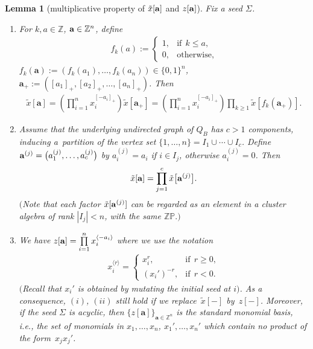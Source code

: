 \documentclass[pdftex]{sigma}
\numberwithin{equation}{section}
\newtheorem{Lemma}[Theorem]{Lemma}
\begin{document}
\begin{Lemma}[multiplicative property of $\tilde{x}{[{\bf a}]}$ and $z{[{\bf a}]}$]\label{multiplicative} Fix a seed $\Sigma$.
\begin{enumerate}\itemsep=0pt
\item[$(i)$] For $k,a\in\mathbb{Z}$, ${\bf a}\in\mathbb{Z}^n$, define
\begin{gather*}
f_k(a)
:=\begin{cases}
1,&\textrm{if} \ \ k\le a,\\
0, &\textrm{otherwise},
\end{cases}
\end{gather*}
$f_k(\mathbf{a}):=(f_k(a_1),\dots,f_k(a_n))\in\{0,1\}^n$,
$\mathbf{a}_+:=([a_1]_+, [a_2]_+,\dots, [a_n]_+)$.
Then
\begin{gather*}
\tilde{x}[\mathbf{a}]
=\left(\prod_{i=1}^n  x_i^{[-a_i]_+}\right)\tilde{x}[\mathbf{a}_+]
=\left(\prod_{i=1}^n  x_i^{[-a_i]_+}\right)\prod_{k\ge1}
\tilde{x}[f_k(\mathbf{a}_+)].
\end{gather*}

\item[$(ii)$] Assume that the underlying undirected graph of $Q_B$ has $c>1$ components, inducing a~partition of the vertex set $\{1,\dots,n\}=I_1\cup\cdots\cup I_c$. Define
${\bf a}^{(j)}=\big(a^{(j)}_1,\dots,a^{(j)}_c\big)$ by $a^{(j)}_i=a_i$ if $i\in I_j$, otherwise $a^{(j)}_i=0$. Then
\begin{gather*}
\tilde{x}[{\bf a}]=\prod_{j=1}^c\tilde{x}\big[{\bf a}^{(j)}\big].
\end{gather*}
$($Note that each factor $\tilde{x}[{\bf a}^{(j)}]$ can be regarded as an element in a cluster algebra of rank $|I_j|<n$, with the same $\mathbb{ZP}.)$

\item[$(iii)$]
We have $z[{\bf a}]=\prod\limits_{i=1}^nx_i^{\langle-a_i\rangle}$ where we use the notation
\begin{gather*}
x_i^{\langle r\rangle}=\begin{cases}
x_i^r,  &\textrm{if} \ \ r\ge 0,\\
(x_i')^{-r}, &\textrm{if} \ \ r< 0.
\end{cases}
\end{gather*}
$($Recall that $x_i'$ is obtained by mutating the initial seed at $i)$.
As a consequence, $(i)$, $(ii)$ still hold if we replace~$\tilde{x}[-]$ by~$z[-]$. Moreover,
if the seed $\Sigma$ is acyclic, then $\{z[\mathbf{a}]\}_{\mathbf{a}\in\mathbb{Z}^n}$ is the standard monomial basis, i.e., the set of monomials in $x_1,\dots,x_n$, $x_1',\dots,x_n'$  which contain no product of the form~$x_jx_j'$.
\end{enumerate}
 \end{Lemma}
\end{document}
